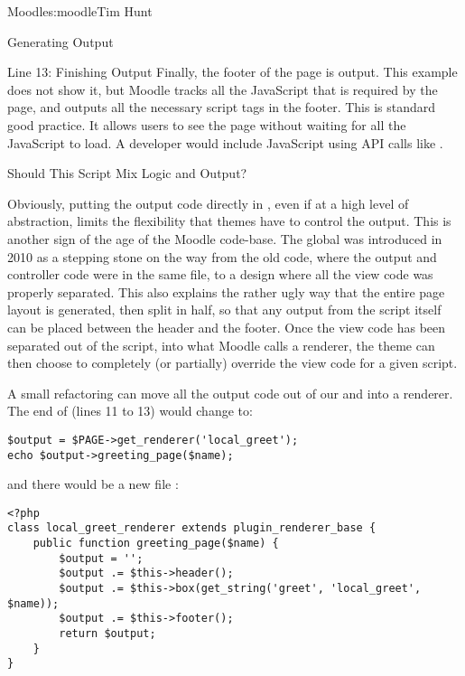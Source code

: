 \begin{aosachapter}{Moodle}{s:moodle}{Tim Hunt}
\begin{aosasect1}{Generating Output}
\begin{aosasect2}{Line 13: Finishing Output}
Finally, the footer of the page is output. This example does
not show it, but Moodle tracks all the JavaScript that is required by
the page, and outputs all the necessary script tags in the
footer. This is standard good practice. It allows users to see the
page without waiting for all the JavaScript to load. A developer would
include JavaScript using API calls like
.

\end{aosasect2}

\begin{aosasect2}{Should This Script Mix Logic and Output?}

Obviously, putting the output code directly in , even
if at a high level of abstraction, limits the flexibility that themes
have to control the output. This is another sign of the age of the
Moodle code-base. The  global was introduced in 2010 as
a stepping stone on the way from the old code, where the output and
controller code were in the same file, to a design where all the view
code was properly separated. This also explains the rather ugly way
that the entire page layout is generated, then split in half, so that
any output from the script itself can be placed between the header and
the footer. Once the view code has been separated out of the script,
into what Moodle calls a renderer, the theme can then choose to
completely (or partially) override the view code for a given script.

A small refactoring can move all the
output code out of our  and into a renderer.
The end of  (lines 11 to 13) would change to:

\begin{verbatim}
$output = $PAGE->get_renderer('local_greet');
echo $output->greeting_page($name);
\end{verbatim}

\noindent and there would be a new file :

\begin{verbatim}
<?php
class local_greet_renderer extends plugin_renderer_base {
    public function greeting_page($name) {
        $output = '';
        $output .= $this->header();
        $output .= $this->box(get_string('greet', 'local_greet', $name));
        $output .= $this->footer();
        return $output;
    }
}
\end{verbatim}


\end{aosasect2}
\end{aosasect1}
\end{aosachapter}
